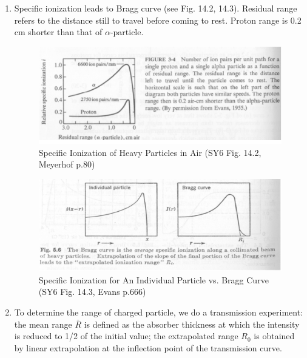 \documentclass{school-22.101-notes}
\begin{document}
\begin{enumerate}
\item Specific ionization leads to Bragg curve (see Fig. 14.2, 14.3). Residual range refers to the distance still to travel before coming to rest. Proton range is 0.2 cm shorter than that of $\alpha$-particle. 
\begin{figure}[ht]
  \centering
  \includegraphics[width=5in]{images/ni/14.2.png}
  \caption{Specific Ionization of Heavy Particles in Air (SY6 Fig. 14.2, Meyerhof p.80)} \label{14.2}
\end{figure}

\begin{figure}[ht]
  \centering
  \includegraphics[width=5in]{images/ni/14.3.png}
  \caption{Specific Ionization for An Individual Particle vs. Bragg Curve (SY6 Fig. 14.3, Evans p.666)} \label{14.3}
\end{figure}


\item To determine the range of charged particle, we do a transmission experiment: the mean range $\bar{R}$ is defined as the absorber thickness at which the intensity is reduced to 1/2 of the initial value; the extrapolated range $R_0$ is obtained by linear extrapolation at the inflection point of the transmission curve. 


\end{enumerate}
\end{document}
